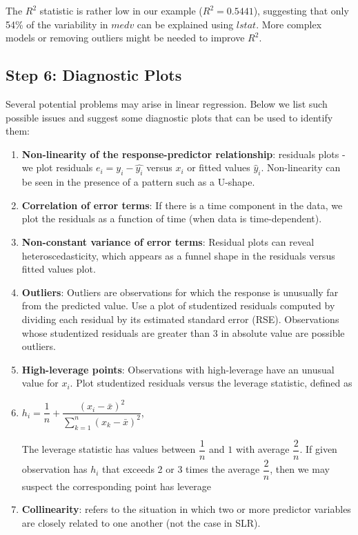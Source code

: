 \documentclass[11pt]{article}
\begin{document}
The \(R^2\) statistic is rather low in our example (\(R^2 = 0.5441\)), suggesting that only 54\% of the variability in \(medv\) can be explained using \(lstat\). More complex models or removing outliers might be needed to improve \(R^2\).

\subsection{Step 6: Diagnostic Plots}

Several potential problems may arise in linear regression. Below we list such possible issues and suggest some diagnostic plots that can be used to identify them:

\begin{enumerate}
    \item \textbf{Non-linearity of the response-predictor relationship}: residuals plots - we plot residuals $e_i = y_i - \hat{y_i}$ versus \(x_i\) or fitted values \(\hat{y}_i\). Non-linearity can be seen in the presence of a pattern such as a U-shape.
    \item \textbf{Correlation of error terms}: If there is a time component in the data, we plot the residuals as a function of time (when data is time-dependent).
    \item \textbf{Non-constant variance of error terms}: Residual plots can reveal heteroscedasticity, which appears as a funnel shape in the residuals versus fitted values plot.
    \item \textbf{Outliers}: Outliers are observations for which the response is unusually far from the predicted value. Use a plot of studentized residuals computed by dividing each residual by its estimated standard error (RSE). Observations whose studentized residuals are greater than 3 in absolute value are possible outliers.
    \item \textbf{High-leverage points}: Observations with high-leverage have an unusual value for \(x_i\). Plot studentized residuals versus the leverage statistic, defined as

    \item \( h_i = \dfrac{1}{n} + \dfrac{(x_i - \bar{x})^2}{\sum_{k=1}^{n}(x_k - \bar{x})^2}\),

    The leverage statistic has values between $\dfrac{1}{n}$ and $1$ with average $\dfrac{2}{n}$. If given observation has $h_i$ that exceeds 2 or 3 times the average $\dfrac{2}{n}$, then we may suspect the corresponding point has leverage

    \item \textbf{Collinearity}: refers to the situation in which two or more predictor variables are closely related to one another (not the case in SLR).
\end{enumerate}
\end{document}
